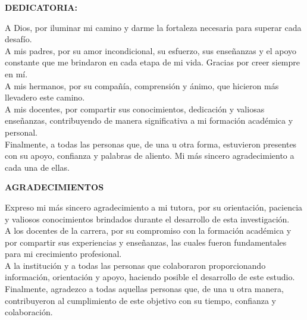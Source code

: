 \documentclass[12pt,letterpaper]{report}
\begin{document}
\newcommand{\mesanio}{%
  \ifcase\month\or
  Enero\or Febrero\or Marzo\or Abril\or Mayo\or Junio\or
  Julio\or Agosto\or Septiembre\or Octubre\or Noviembre\or Diciembre
  \fi\ - \the\year
}
\hypersetup{pageanchor=false}



\clearpage
\thispagestyle{plain}
\begin{flushright}
\textbf{DEDICATORIA:}
\end{flushright}
A Dios, por iluminar mi camino y darme la fortaleza necesaria para superar cada desafío.\\
A mis padres, por su amor incondicional, su esfuerzo, sus enseñanzas y el apoyo constante que me brindaron en cada etapa de mi vida. Gracias por creer siempre en mí.\\
A mis hermanos, por su compañía, comprensión y ánimo, que hicieron más llevadero este camino.\\
A mis docentes, por compartir sus conocimientos, dedicación y valiosas enseñanzas, contribuyendo de manera significativa a mi formación académica y personal.\\
Finalmente, a todas las personas que, de una u otra forma, estuvieron presentes con su apoyo, confianza y palabras de aliento. Mi más sincero agradecimiento a cada una de ellas.

\clearpage
\thispagestyle{plain}
\begin{center}
\textbf{AGRADECIMIENTOS}
\end{center}
Expreso mi más sincero agradecimiento a mi tutora, por su orientación, paciencia y valiosos conocimientos brindados durante el desarrollo de esta investigación.\\
A los docentes de la carrera, por su compromiso con la formación académica y por compartir sus experiencias y enseñanzas, las cuales fueron fundamentales para mi crecimiento profesional.\\
A la institución y a todas las personas que colaboraron proporcionando información, orientación y apoyo, haciendo posible el desarrollo de este estudio.\\
Finalmente, agradezco a todas aquellas personas que, de una u otra manera, contribuyeron al cumplimiento de este objetivo con su tiempo, confianza y colaboración.
\end{document}
